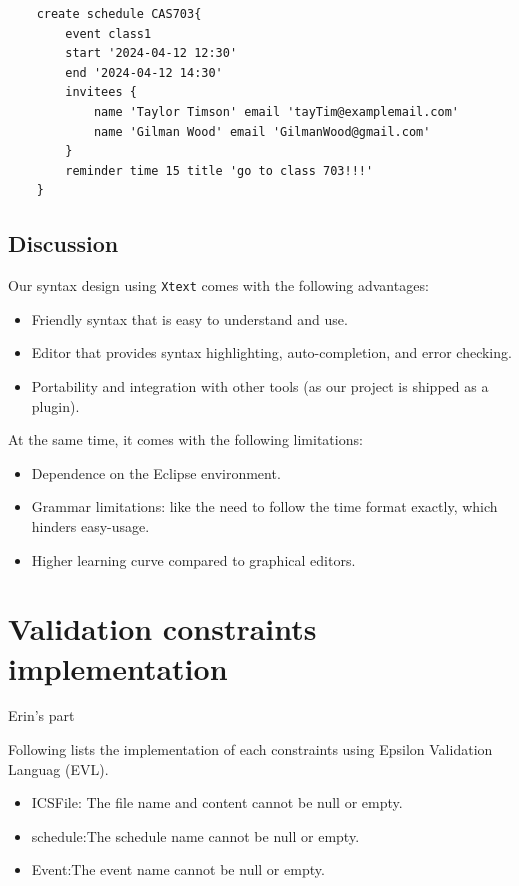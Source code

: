 \documentclass[12pt, letterpaper, twoside]{article}
\begin{document}
\begin{verbatim}
    create schedule CAS703{
        event class1 
        start '2024-04-12 12:30'
        end '2024-04-12 14:30'
        invitees {
            name 'Taylor Timson' email 'tayTim@examplemail.com'
            name 'Gilman Wood' email 'GilmanWood@gmail.com'
        }
        reminder time 15 title 'go to class 703!!!'
    }
\end{verbatim}

\subsection{Discussion}
Our syntax design using \texttt{Xtext} comes with the following advantages:
\begin{itemize}
    \item Friendly syntax that is easy to understand and use.
    \item Editor that provides syntax highlighting, auto-completion, and error checking.
    \item Portability and integration with other tools (as our project is shipped as a plugin). 
\end{itemize}
At the same time, it comes with the following limitations:
\begin{itemize}
    \item Dependence on the Eclipse environment.
    \item Grammar limitations: like the need to follow the time format exactly, which hinders easy-usage.
    \item Higher learning curve compared to graphical editors.
\end{itemize}


\newpage
\section{Validation constraints implementation}
Erin's part

Following lists the implementation of each constraints using Epsilon Validation Languag (EVL).
\begin{itemize}
    \item ICSFile: The file name and content cannot be null or empty.    
    \item schedule:The schedule name cannot be null or empty.
    \item Event:The event name cannot be null or empty. 
\end{itemize}

\newpage
\end{document}
